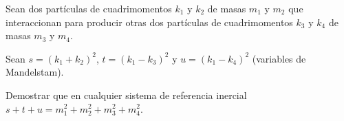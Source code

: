 Sean  dos  partículas  de  cuadrimomentos $k_1$ y $k_2$ de  masas $m_1$ y $m_2$ que  interaccionan  para  producir otras dos partículas de cuadrimomentos $k_3$ y $k_4$ de  masas $m_3$ y $m_4$.

Sean $s=\left(k_{1}+k_{2}\right)^{2}$, $t=\left(k_{1}-k_{3}\right)^{2}$ y $u=\left(k_{1}-k_{4}\right)^{2}$ (variables  de  Mandelstam).

Demostrar  que  en  cualquier  sistema  de  referencia  inercial $s+t+u=m_{1}^{2}+m_{2}^{2}+m_{3}^{2}+m_{4}^{2}$.

\begin{solution}\ \\

\end{solution}